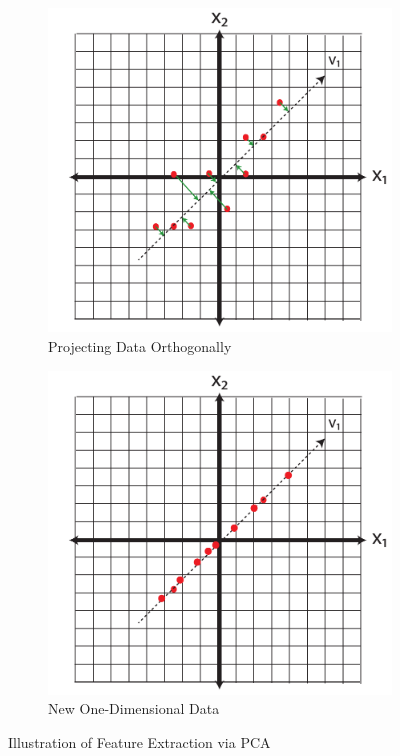 \documentclass[
]{article}
\theoremstyle{definition}
\theoremstyle{definition}
\theoremstyle{definition}
\theoremstyle{definition}
\theoremstyle{remark}
\begin{document}
\begin{figure}[h!]
\centering
\begin{subfigure}[b]{0.45\textwidth}
\includegraphics[width=\textwidth]{figs/pcproj1.pdf}
\caption{Projecting Data Orthogonally}
\label{select1}
\end{subfigure}
\begin{subfigure}[b]{0.45\textwidth}
\includegraphics[width=\textwidth]{figs/pcproj2.pdf}
\caption{New One-Dimensional Data}
\label{select2}
\end{subfigure}
\caption{Illustration of Feature Extraction via PCA}
\label{pcaproj}
\end{figure}
\end{document}
